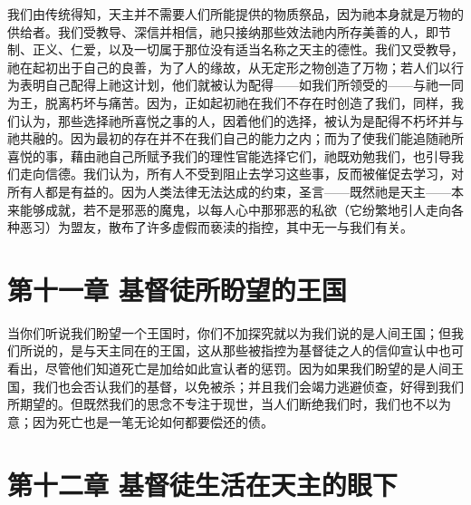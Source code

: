 我们由传统得知，天主并不需要人们所能提供的物质祭品，因为祂本身就是万物的供给者。我们受教导、深信并相信，祂只接纳那些效法祂内所存美善的人，即节制、正义、仁爱，以及一切属于那位没有适当名称之天主的德性。我们又受教导，祂在起初出于自己的良善，为了人的缘故，从无定形之物创造了万物；若人们以行为表明自己配得上祂这计划，他们就被认为配得——如我们所领受的——与祂一同为王，脱离朽坏与痛苦。因为，正如起初祂在我们不存在时创造了我们，同样，我们认为，那些选择祂所喜悦之事的人，因着他们的选择，被认为是配得不朽坏并与祂共融的。因为最初的存在并不在我们自己的能力之内；而为了使我们能追随祂所喜悦的事，藉由祂自己所赋予我们的理性官能选择它们，祂既劝勉我们，也引导我们走向信德。我们认为，所有人不受到阻止去学习这些事，反而被催促去学习，对所有人都是有益的。因为人类法律无法达成的约束，圣言——既然祂是天主——本来能够成就，若不是邪恶的魔鬼，以每人心中那邪恶的私欲（它纷繁地引人走向各种恶习）为盟友，散布了许多虚假而亵渎的指控，其中无一与我们有关。\par


\section{第十一章 基督徒所盼望的王国}

当你们听说我们盼望一个王国时，你们不加探究就以为我们说的是人间王国；但我们所说的，是与天主同在的王国，这从那些被指控为基督徒之人的信仰宣认中也可看出，尽管他们知道死亡是加给如此宣认者的惩罚。因为如果我们盼望的是人间王国，我们也会否认我们的基督，以免被杀；并且我们会竭力逃避侦查，好得到我们所期望的。但既然我们的思念不专注于现世，当人们断绝我们时，我们也不以为意；因为死亡也是一笔无论如何都要偿还的债。\par


\section{第十二章 基督徒生活在天主的眼下}

